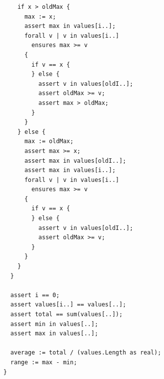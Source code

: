 \documentclass{article}
\begin{document}
\begin{lstlisting}
    if x > oldMax {
      max := x;
      assert max in values[i..];
      forall v | v in values[i..]
        ensures max >= v
      {
        if v == x {
        } else {
          assert v in values[oldI..];
          assert oldMax >= v;
          assert max > oldMax;
        }
      }
    } else {
      max := oldMax;
      assert max >= x;
      assert max in values[oldI..];
      assert max in values[i..];
      forall v | v in values[i..]
        ensures max >= v
      {
        if v == x {
        } else {
          assert v in values[oldI..];
          assert oldMax >= v;
        }
      }
    }
  }

  assert i == 0;
  assert values[i..] == values[..];
  assert total == sum(values[..]);
  assert min in values[..];
  assert max in values[..];

  average := total / (values.Length as real);
  range := max - min;
}
\end{lstlisting}
\end{document}
